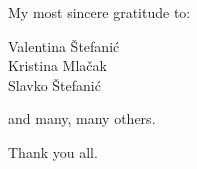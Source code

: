 \documentclass[a5paper,12pt,draft]{book} %
\begin{document}
\thispagestyle{empty}
\vspace*{0.1\textheight}
\clearpage %

\thispagestyle{empty}
\vspace*{0.2\textheight}
\begin{flushright}
My most sincere gratitude to:

Valentina Štefanić \\
Kristina Mlačak \\
Slavko Štefanić

and many, many others.

Thank you all.
\end{flushright}
\clearpage %

\thispagestyle{empty}
\vspace*{0.1\textheight}
\clearpage %












\end{document}
